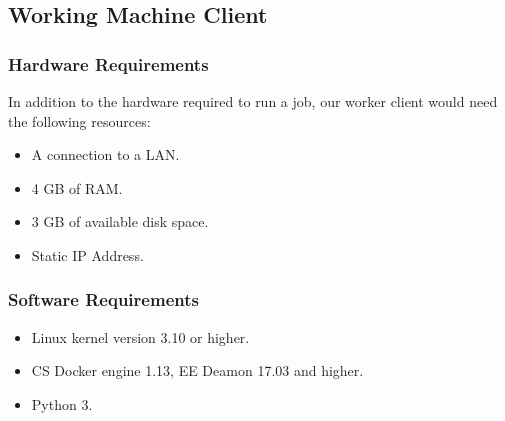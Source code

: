   \subsection{Working Machine Client}
    \subsubsection{Hardware Requirements}
      In addition to the hardware required to run a job, our worker client would need the following resources:
    \begin{itemize}
      \item A connection to a LAN.
      \item 4 GB of RAM.
      \item 3 GB of available disk space.
      \item Static IP Address.
    \end{itemize}
    \subsubsection{Software Requirements}  
    \begin{itemize}
      \item Linux kernel version 3.10 or higher.
      \item CS Docker engine 1.13, EE Deamon 17.03 and higher.
      \item Python 3.
    \end{itemize}
    